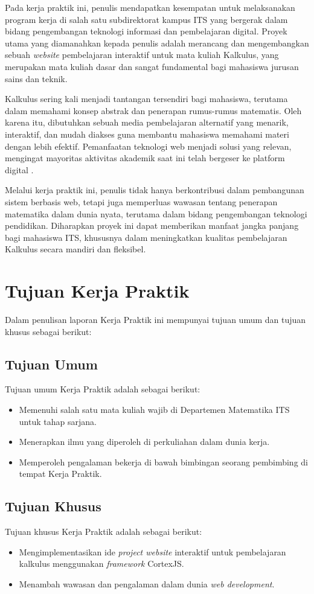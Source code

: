 \documentclass{file/KP-ITS}
\theoremstyle{definition}
\theoremstyle{definition}
\theoremstyle{plain}
\begin{document}
Pada kerja praktik ini, penulis mendapatkan kesempatan untuk melaksanakan program kerja di salah satu subdirektorat kampus ITS yang bergerak dalam bidang pengembangan teknologi informasi dan pembelajaran digital. Proyek utama yang diamanahkan kepada penulis adalah merancang dan mengembangkan sebuah \textit{website} pembelajaran interaktif untuk mata kuliah Kalkulus, yang merupakan mata kuliah dasar dan sangat fundamental bagi mahasiswa jurusan sains dan teknik.

Kalkulus sering kali menjadi tantangan tersendiri bagi mahasiswa, terutama dalam memahami konsep abstrak dan penerapan rumus-rumus matematis. Oleh karena itu, dibutuhkan sebuah media pembelajaran alternatif yang menarik, interaktif, dan mudah diakses guna membantu mahasiswa memahami materi dengan lebih efektif. Pemanfaatan teknologi web menjadi solusi yang relevan, mengingat mayoritas aktivitas akademik saat ini telah bergeser ke platform digital \cite{mustafidah2010,rahmawati2018}.

Melalui kerja praktik ini, penulis tidak hanya berkontribusi dalam pembangunan sistem berbasis web, tetapi juga memperluas wawasan tentang penerapan matematika dalam dunia nyata, terutama dalam bidang pengembangan teknologi pendidikan. Diharapkan proyek ini dapat memberikan manfaat jangka panjang bagi mahasiswa ITS, khususnya dalam meningkatkan kualitas pembelajaran Kalkulus secara mandiri dan fleksibel.

\section{Tujuan Kerja Praktik}
Dalam penulisan laporan Kerja Praktik ini mempunyai tujuan umum dan tujuan khusus sebagai berikut:
\subsection{Tujuan Umum}
Tujuan umum Kerja Praktik adalah sebagai berikut:
\begin{itemize}
    \item Memenuhi salah satu mata kuliah wajib di Departemen Matematika ITS untuk tahap sarjana.
    \item Menerapkan ilmu yang diperoleh di perkuliahan dalam dunia kerja.
    \item Memperoleh pengalaman bekerja di bawah bimbingan seorang pembimbing di tempat Kerja Praktik.
\end{itemize}

\subsection{Tujuan Khusus}
Tujuan khusus Kerja Praktik adalah sebagai berikut:
\begin{itemize}
    \item Mengimplementasikan ide \textit{project website} interaktif untuk pembelajaran kalkulus menggunakan \textit{framework} CortexJS.
    \item Menambah wawasan dan pengalaman dalam dunia \textit{web development}.
\end{itemize}
\end{document}
